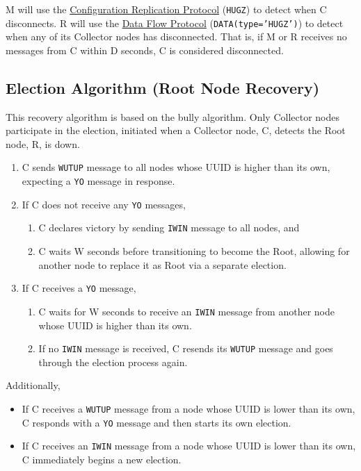 M will use the \hyperref[proto_config]{Configuration Replication Protocol} (\texttt{HUGZ}) to detect when C disconnects.
R will use the \hyperref[proto_data]{Data Flow Protocol} (\texttt{DATA(type='HUGZ')}) to detect when any of its
Collector nodes has disconnected. That is, if M or R receives no messages from C within D seconds, C is considered
disconnected.

\subsection{Election Algorithm (Root Node Recovery)}
\label{algor_elect}

This recovery algorithm is based on the bully algorithm\cite{needed}. Only Collector nodes participate in the election,
initiated when a Collector node, C, detects the Root node, R, is down.

\begin{enumerate}
\item C sends \texttt{WUTUP} message to all nodes whose UUID is higher than its own, expecting a \texttt{YO} message in
      response.
\item If C does not receive any \texttt{YO} messages,
      \begin{enumerate}
      \item C declares victory by sending \texttt{IWIN} message to all nodes, and
      \item C waits W seconds before transitioning to become the Root, allowing for another node to replace it as Root
            via a separate election.
      \end{enumerate}
\item If C receives a \texttt{YO} message,
      \begin{enumerate}
      \item C waits for W seconds to receive an \texttt{IWIN} message from another node whose UUID is higher than its
            own.
      \item If no \texttt{IWIN} message is received, C resends its \texttt{WUTUP} message and goes through the election
            process again.
      \end{enumerate}
\end{enumerate}

Additionally,

\begin{itemize}
\item If C receives a \texttt{WUTUP} message from a node whose UUID is lower than its own, C responds with a \texttt{YO}
      message and then starts its own election.
\item If C receives an \texttt{IWIN} message from a node whose UUID is lower than its own, C immediately begins a new
      election.
\end{itemize}

